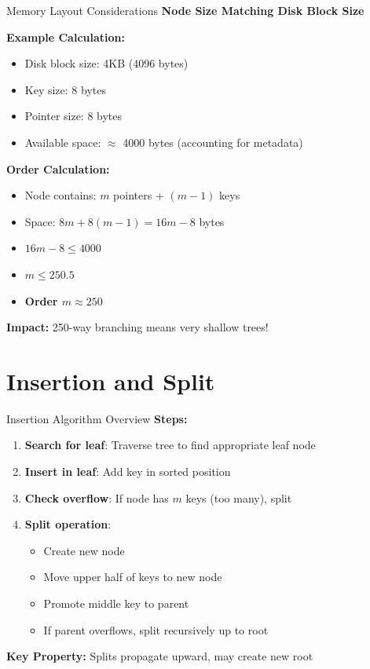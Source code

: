 \documentclass[aspectratio=169]{beamer}
\begin{document}
\begin{frame}{Memory Layout Considerations}
  \textbf{Node Size Matching Disk Block Size}

  \vspace{0.3cm}
  \textbf{Example Calculation:}
  \begin{itemize}
    \item Disk block size: 4KB (4096 bytes)
    \item Key size: 8 bytes
    \item Pointer size: 8 bytes
    \item Available space: $\approx$ 4000 bytes (accounting for metadata)
  \end{itemize}

  \vspace{0.3cm}
  \textbf{Order Calculation:}
  \begin{itemize}
    \item Node contains: $m$ pointers + $(m-1)$ keys
    \item Space: $8m + 8(m-1) = 16m - 8$ bytes
    \item $16m - 8 \leq 4000$
    \item $m \leq 250.5$
    \item \textbf{Order $m \approx 250$}
  \end{itemize}

  \vspace{0.3cm}
  \textbf{Impact:} 250-way branching means very shallow trees!
\end{frame}

\section{Insertion and Split}

\begin{frame}{Insertion Algorithm Overview}
  \textbf{Steps:}
  \begin{enumerate}
    \item \textbf{Search for leaf}: Traverse tree to find appropriate leaf node
    \item \textbf{Insert in leaf}: Add key in sorted position
    \item \textbf{Check overflow}: If node has $m$ keys (too many), split
    \item \textbf{Split operation}:
    \begin{itemize}
      \item Create new node
      \item Move upper half of keys to new node
      \item Promote middle key to parent
      \item If parent overflows, split recursively up to root
    \end{itemize}
  \end{enumerate}

  \vspace{0.3cm}
  \textbf{Key Property:} Splits propagate upward, may create new root
\end{frame}
\end{document}
